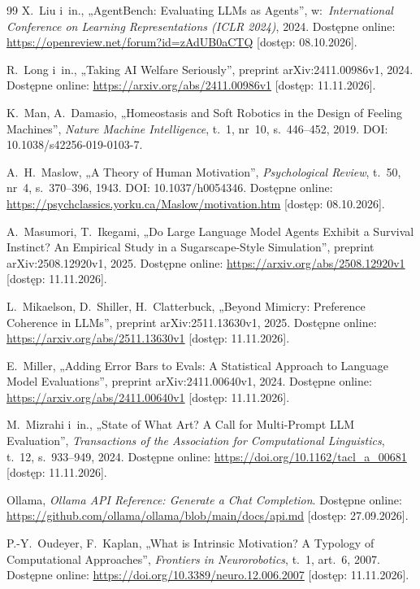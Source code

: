 \begin{thebibliography}{99}
 X.~Liu i~in., „{AgentBench}: Evaluating {LLMs} as Agents”, w:~\textit{International Conference on Learning Representations (ICLR 2024)}, 2024. Dostępne online: \url{https://openreview.net/forum?id=zAdUB0aCTQ} [dostęp: 08.10.2026].

 R.~Long i~in., „Taking {AI} Welfare Seriously”, preprint arXiv:2411.00986v1, 2024. Dostępne online: \url{https://arxiv.org/abs/2411.00986v1} [dostęp: 11.11.2026].

 K.~Man, A.~Damasio, „Homeostasis and Soft Robotics in the Design of Feeling Machines”, \textit{Nature Machine Intelligence}, t.~1, nr~10, s.~446--452, 2019. DOI: 10.1038/s42256-019-0103-7.

 A.~H.~Maslow, „A Theory of Human Motivation”, \textit{Psychological Review}, t.~50, nr~4, s.~370--396, 1943. DOI: 10.1037/h0054346. Dostępne online: \url{https://psychclassics.yorku.ca/Maslow/motivation.htm} [dostęp: 08.10.2026].

 A.~Masumori, T.~Ikegami, „Do Large Language Model Agents Exhibit a Survival Instinct? {An} Empirical Study in a {Sugarscape}-Style Simulation”, preprint arXiv:2508.12920v1, 2025. Dostępne online: \url{https://arxiv.org/abs/2508.12920v1} [dostęp: 11.11.2026].

 L.~Mikaelson, D.~Shiller, H.~Clatterbuck, „Beyond Mimicry: Preference Coherence in {LLMs}”, preprint arXiv:2511.13630v1, 2025. Dostępne online: \url{https://arxiv.org/abs/2511.13630v1} [dostęp: 11.11.2026].

 E.~Miller, „Adding Error Bars to Evals: A Statistical Approach to Language Model Evaluations”, preprint arXiv:2411.00640v1, 2024. Dostępne online: \url{https://arxiv.org/abs/2411.00640v1} [dostęp: 11.11.2026].

 M.~Mizrahi i~in., „State of What Art? {A} Call for Multi-Prompt {LLM} Evaluation”, \textit{Transactions of the Association for Computational Linguistics}, t.~12, s.~933--949, 2024. Dostępne online: \url{https://doi.org/10.1162/tacl_a_00681} [dostęp: 11.11.2026].

 Ollama, \textit{Ollama {API} Reference: Generate a Chat Completion}. Dostępne online: \url{https://github.com/ollama/ollama/blob/main/docs/api.md} [dostęp: 27.09.2026].

 P.-Y.~Oudeyer, F.~Kaplan, „What is Intrinsic Motivation? A Typology of Computational Approaches”, \textit{Frontiers in Neurorobotics}, t.~1, art.~6, 2007. Dostępne online: \url{https://doi.org/10.3389/neuro.12.006.2007} [dostęp: 11.11.2026].


\end{thebibliography}
